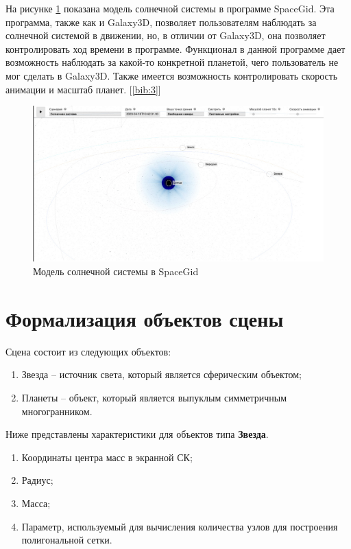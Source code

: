 	\par На рисунке \ref{pic:spacegid} показана модель солнечной системы в программе SpaceGid. Эта программа, также как и Galaxy3D, позволяет пользователям наблюдать за солнечной системой в движении, но, в отличии от Galaxy3D, она позволяет контролировать ход времени в программе. Функционал в данной программе дает возможность наблюдать за какой-то конкретной планетой, чего пользователь не мог сделать в Galaxy3D. Также имеется возможность контролировать скорость анимации и масштаб планет. [\ref{bib:3}]
	\begin{figure}[h!]
        \includegraphics[scale=0.9]{inc/Galaxy3D.jpg}
        \caption{Модель солнечной системы в SpaceGid}
        \label{pic:spacegid}
	\end{figure}

	\par \text{  }
	\par \text{  }
	\par \text{  }
	\section{Формализация объектов сцены}
	\par Сцена состоит из следующих объектов:
	\begin{enumerate}
		\item Звезда -- источник света, который является сферическим объектом;
		\item Планеты -- объект, который является выпуклым симметричным многогранником.
	\end{enumerate}

	\par Ниже представлены характеристики для объектов типа \textbf{Звезда}.
	\begin{enumerate}
		\item Координаты центра масс в экранной СК;
		\item Радиус;
		\item Масса;
		\item Параметр, используемый для вычисления количества узлов для построения полигональной сетки.
	\end{enumerate}

